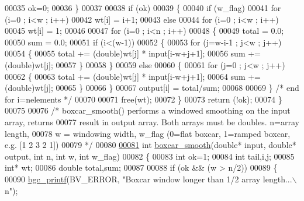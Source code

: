 \begin{DoxyCode}
00035         ok=0;
00036     \}
00037 
00038     \textcolor{keywordflow}{if} (ok)
00039     \{
00040         \textcolor{keywordflow}{if} (w\_flag)
00041             \textcolor{keywordflow}{for} (i=0 ; i<w ; i++)
00042                 wt[i] = i+1;
00043         \textcolor{keywordflow}{else}
00044             \textcolor{keywordflow}{for} (i=0 ; i<w ; i++)
00045                 wt[i] = 1;
00046 
00047         \textcolor{keywordflow}{for} (i=0 ; i<n ; i++)
00048         \{
00049             total = 0.0;
00050             sum = 0.0;
00051             \textcolor{keywordflow}{if} (i<(w-1))
00052             \{
00053                 \textcolor{keywordflow}{for} (j=w-i-1 ; j<w ; j++)
00054                 \{
00055                     total += (double)wt[j] * input[i-w+j+1];
00056                     sum += (double)wt[j];
00057                 \}
00058             \}
00059             \textcolor{keywordflow}{else}
00060             \{
00061                 \textcolor{keywordflow}{for} (j=0 ; j<w ; j++)
00062                 \{
00063                     total += (double)wt[j] * input[i-w+j+1];
00064                     sum += (double)wt[j];
00065                 \}
00066             \}
00067             output[i] = total/sum;
00068             
00069         \} \textcolor{comment}{/* end for i=nelements */}
00070         
00071         free(wt);
00072     \}
00073     \textcolor{keywordflow}{return} (!ok);
00074 \}
00075 
00076 \textcolor{comment}{/* boxcar\_smooth() performs a windowed smoothing on the input array, returns}
00077 \textcolor{comment}{result in output array. Both arrays must be doubles. n=array length,}
00078 \textcolor{comment}{w = windowing width, w\_flag (0=flat boxcar, 1=ramped boxcar, e.g. [1 2 3 2 1])}
00079 \textcolor{comment}{*/}
00080 
\hypertarget{smooth_8c_source_l00081}{}\hyperlink{smooth_8c_ac9c8750166146d2aa5f25c38e3451e9f}{00081} \textcolor{keywordtype}{int} \hyperlink{smooth_8c_ac9c8750166146d2aa5f25c38e3451e9f}{boxcar\_smooth}(\textcolor{keywordtype}{double}* input, \textcolor{keywordtype}{double}* output, \textcolor{keywordtype}{int} n, \textcolor{keywordtype}{int} w, \textcolor{keywordtype}{int} w\_flag)
00082 \{
00083     \textcolor{keywordtype}{int} ok=1;
00084     \textcolor{keywordtype}{int} tail,i,j;
00085     \textcolor{keywordtype}{int}* wt;
00086     \textcolor{keywordtype}{double} total,sum;
00087 
00088     \textcolor{keywordflow}{if} (ok && (w > n/2))
00089     \{
00090         \hyperlink{bgc__io_8c_af287cce6e2aede1ce337de9319e80d0d}{bgc\_printf}(BV\_ERROR, \textcolor{stringliteral}{"Boxcar window longer than 1/2 array length...\(\backslash\)n"});

\end{DoxyCode}
